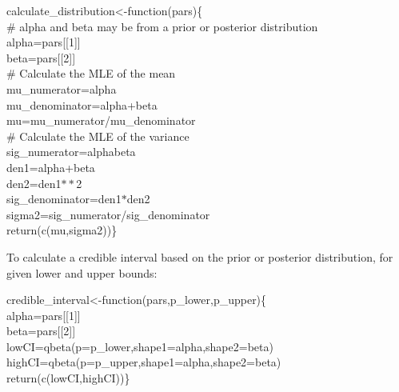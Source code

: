 \documentclass[12pt]{article}
\begin{document}
    \vspace{12pt}
    \begin{em}
    \noindent \hspace{2pt}calculate\_distribution\textless-function(pars)\{\\
     \vspace{4pt}
     \# alpha and beta may be from a prior or posterior distribution\\
      alpha=pars[[1]]\\
      beta=pars[[2]]\\
      \vspace{4pt}
      \# Calculate the MLE of the mean\\
      mu\_numerator=alpha\\
      mu\_denominator=alpha+beta\\
      mu=mu\_numerator/mu\_denominator\\
      \vspace{4pt}
      \# Calculate the MLE of the variance\\
      sig\_numerator=alpha\*beta\\
      den1=alpha+beta\\
      den2=den1$**$2\\
      sig\_denominator=den1$*$den2\\
      sigma2=sig\_numerator/sig\_denominator\\
      return(c(mu,sigma2))\}
    \end{em}
  \vspace{12pt}
      
  \clearpage

  To calculate a credible interval based on the prior or posterior distribution, for given lower and upper bounds:


  \vspace{12pt}
  \begin{em}
  \noindent \hspace{2pt}credible\_interval\textless-function(pars,p\_lower,p\_upper)\{\\
    \vspace{4pt}
    alpha=pars[[1]]\\
    beta=pars[[2]]\\
    lowCI=qbeta(p=p\_lower,shape1=alpha,shape2=beta)\\
    highCI=qbeta(p=p\_upper,shape1=alpha,shape2=beta)\\
    return(c(lowCI,highCI))\}
  \end{em}
  \vspace{12pt}
\end{document}
